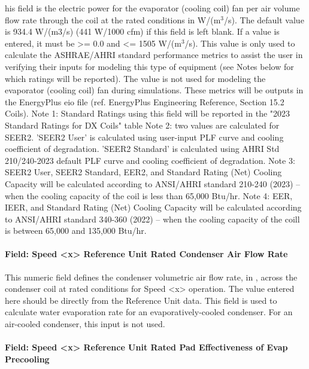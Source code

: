 his field is the electric power for the evaporator (cooling coil) fan per air volume flow rate through the coil at the rated conditions in W/(m\(^{3}\)/s). The default value is 934.4 W/(m3/s) (441 W/1000 cfm) if this field is left blank. If a value is entered, it must be \textgreater{}= 0.0 and \textless{}= 1505 W/(m\(^{3}\)/s). This value is only used to calculate the ASHRAE/AHRI standard performance metrics to assist the user in verifying their inputs for modeling this type of equipment (see Notes below for which ratings will be reported).  The value is not used for modeling the evaporator (cooling coil) fan during simulations.  These metrics will be outputs in the EnergyPlus eio file (ref. EnergyPlus Engineering Reference, Section 15.2 Coils).
Note 1: Standard Ratings using this field will be reported in the "2023 Standard Ratings for DX Coils" table
Note 2: two values are calculated for SEER2. 'SEER2 User' is calculated using user-input PLF curve and cooling coefficient of degradation. 'SEER2 Standard' is calculated using AHRI Std 210/240-2023 default PLF curve and cooling coefficient of degradation.
Note 3: SEER2 User, SEER2 Standard, EER2, and Standard Rating (Net) Cooling Capacity will be calculated according to ANSI/AHRI standard 210-240 (2023) -- when the cooling capacity of the coil is less than 65,000 Btu/hr.
Note 4: EER, IEER, and Standard Rating (Net) Cooling Capacity will be calculated according to ANSI/AHRI standard 340-360 (2022) -- when the cooling capacity of the coill is between 65,000 and 135,000 Btu/hr.

\paragraph{Field: Speed \textless{}x\textgreater{} Reference Unit Rated Condenser Air Flow Rate}\label{field-speed-x-reference-unit-rated-condenser-air-flow-rate}

This numeric field defines the condenser volumetric air flow rate, in \si{\volumeFlowRate}, across the condenser coil at rated conditions for Speed \textless{}x\textgreater{} operation. The value entered here should be directly from the Reference Unit data. This field is used to calculate water evaporation rate for an evaporatively-cooled condenser. For an air-cooled condenser, this input is not used.

\paragraph{Field: Speed \textless{}x\textgreater{} Reference Unit Rated Pad Effectiveness of Evap Precooling}\label{field-speed-x-reference-unit-rated-pad-effectiveness-of-evap-precooling}

